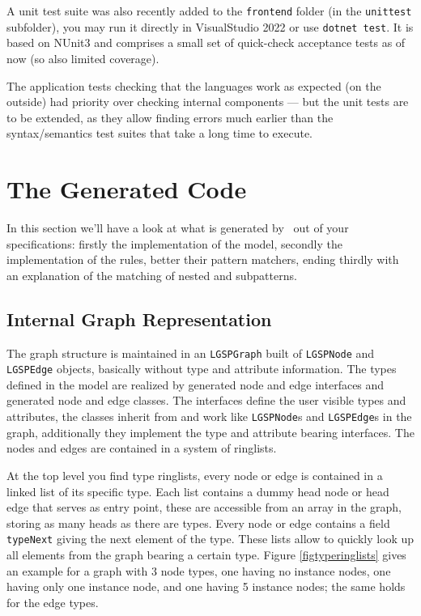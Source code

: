 A unit test suite was also recently added to the \texttt{frontend} folder (in the \texttt{unittest} subfolder), you may run it directly in VisualStudio 2022 or use \texttt{dotnet test}.
It is based on NUnit3 and comprises a small set of quick-check acceptance tests as of now (so also limited coverage).

The application tests checking that the languages work as expected (on the outside) had priority over checking internal components --- but the unit tests are to be extended, as they allow finding errors much earlier than the syntax/semantics test suites that take a long time to execute.


\section{The Generated Code}\label{sec:generatedcode}
In this section we'll have a look at what is generated by \GrG~out of your specifications: firstly the implementation of the model, secondly the implementation of the rules, better their pattern matchers, ending thirdly with an explanation of the matching of nested and subpatterns.

\subsection*{Internal Graph Representation}
The graph structure is maintained in an \texttt{LGSPGraph} built of \texttt{LGSPNode} and \texttt{LGSPEdge} objects, basically without type and attribute information.
The types defined in the model are realized by generated node and edge interfaces and generated node and edge classes.
The interfaces define the user visible types and attributes, the classes inherit from and work like \texttt{LGSPNode}s and \texttt{LGSPEdge}s in the graph, additionally they implement the type and attribute bearing interfaces.
The nodes and edges are contained in a system of ringlists.

At the top level you find type ringlists, every node or edge is contained in a linked list of its specific type.
Each list contains a dummy head node or head edge that serves as entry point, 
these are accessible from an array in the graph, storing as many heads as there are types.
Every node or edge contains a field \texttt{typeNext} giving the next element of the type.
These lists allow to quickly look up all elements from the graph bearing a certain type.
Figure \ref{figtyperinglists} gives an example for a graph with 3 node types, one having no instance nodes, one having only one instance node, and one having 5 instance nodes; the same holds for the edge types.

